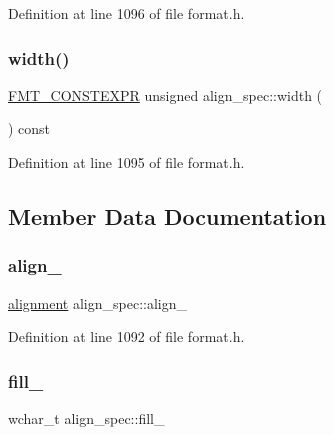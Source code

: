 Definition at line 1096 of file format.\+h.

\mbox{\label{structalign__spec_a863232f1045d21017ffcd7c498c58c3d}} 
\subsubsection{\texorpdfstring{width()}{width()}}
{\footnotesize\ttfamily \hyperlink{core_8h_a69201cb276383873487bf68b4ef8b4cd}{F\+M\+T\+\_\+\+C\+O\+N\+S\+T\+E\+X\+PR} unsigned align\+\_\+spec\+::width (\begin{DoxyParamCaption}{ }\end{DoxyParamCaption}) const\hspace{0.3cm}{\ttfamily [inline]}}



Definition at line 1095 of file format.\+h.



\subsection{Member Data Documentation}
\mbox{\label{structalign__spec_aecf6413f2b63d90a4350375a247d26ad}} 
\subsubsection{\texorpdfstring{align\+\_\+}{align\_}}
{\footnotesize\ttfamily \hyperlink{format_8h_a5460ac1c70db05be4ec2268f463ea981}{alignment} align\+\_\+spec\+::align\+\_\+}



Definition at line 1092 of file format.\+h.

\mbox{\label{structalign__spec_a0fa9232e9b9f8c428bbebca3e7278da9}} 
\subsubsection{\texorpdfstring{fill\+\_\+}{fill\_}}
{\footnotesize\ttfamily wchar\+\_\+t align\+\_\+spec\+::fill\+\_\+}



